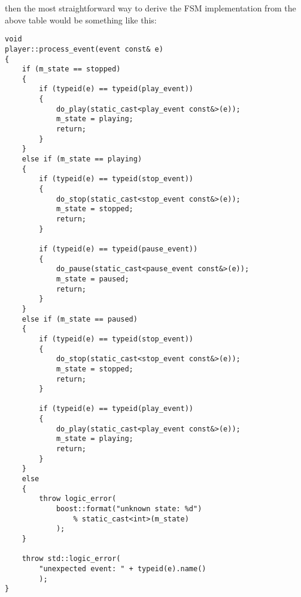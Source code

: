 \documentclass{netobjectdays}
\begin{document}

then the most straightforward way to derive the FSM 
implementation from the above table would be something 
like this:

{\footnotesize
\begin{verbatim}
void
player::process_event(event const& e)
{
    if (m_state == stopped)
    {
        if (typeid(e) == typeid(play_event))
        {
            do_play(static_cast<play_event const&>(e));
            m_state = playing;
            return;
        }
    }
    else if (m_state == playing)
    {
        if (typeid(e) == typeid(stop_event))
        {
            do_stop(static_cast<stop_event const&>(e));
            m_state = stopped;
            return;
        }

        if (typeid(e) == typeid(pause_event))
        {
            do_pause(static_cast<pause_event const&>(e));
            m_state = paused;
            return;
        }
    }
    else if (m_state == paused)
    {
        if (typeid(e) == typeid(stop_event))
        {
            do_stop(static_cast<stop_event const&>(e));
            m_state = stopped;
            return;
        }

        if (typeid(e) == typeid(play_event))
        {
            do_play(static_cast<play_event const&>(e));
            m_state = playing;
            return;
        }
    }
    else
    {
        throw logic_error(
            boost::format("unknown state: %d")
                % static_cast<int>(m_state)
            );
    }

    throw std::logic_error(
        "unexpected event: " + typeid(e).name()
        );
}
\end{verbatim}
}
\end{document}
